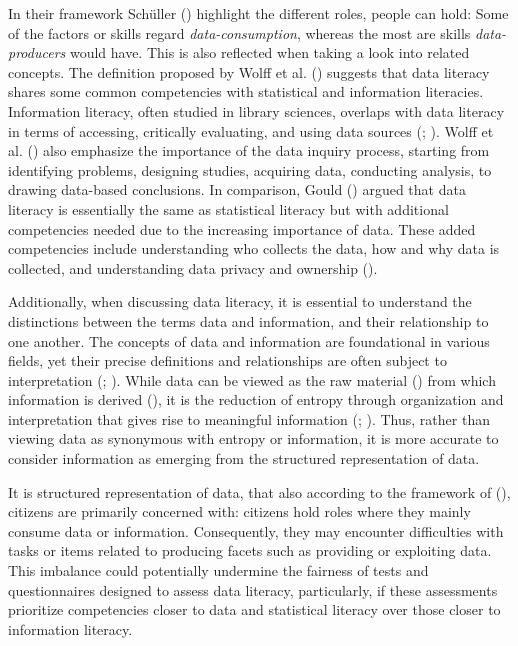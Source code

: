 \documentclass[
  12pt,
  a4paper,
  twoside]{article}
\begin{document}
In their framework Schüller () highlight the different roles, people can hold: Some of the factors or skills regard \emph{data-consumption}, whereas the most are skills \emph{data-producers} would have. This is also reflected when taking a look into related concepts. The definition proposed by Wolff et al. () suggests that data literacy shares some common competencies with statistical and information literacies.\\
Information literacy, often studied in library sciences, overlaps with data literacy in terms of accessing, critically evaluating, and using data sources (; ). Wolff et al. () also emphasize the importance of the data inquiry process, starting from identifying problems, designing studies, acquiring data, conducting analysis, to drawing data-based conclusions. In comparison, Gould () argued that data literacy is essentially the same as statistical literacy but with additional competencies needed due to the increasing importance of data. These added competencies include understanding who collects the data, how and why data is collected, and understanding data privacy and ownership ().

Additionally, when discussing data literacy, it is essential to understand the distinctions between the terms data and information, and their relationship to one another. The concepts of data and information are foundational in various fields, yet their precise definitions and relationships are often subject to interpretation (; ). While data can be viewed as the raw material () from which information is derived (), it is the reduction of entropy through organization and interpretation that gives rise to meaningful information (; ). Thus, rather than viewing data as synonymous with entropy or information, it is more accurate to consider information as emerging from the structured representation of data.

It is structured representation of data, that also according to the framework of (), citizens are primarily concerned with: citizens hold roles where they mainly consume data or information. Consequently, they may encounter difficulties with tasks or items related to producing facets such as providing or exploiting data. This imbalance could potentially undermine the fairness of tests and questionnaires designed to assess data literacy, particularly, if these assessments prioritize competencies closer to data and statistical literacy over those closer to information literacy.
\end{document}

